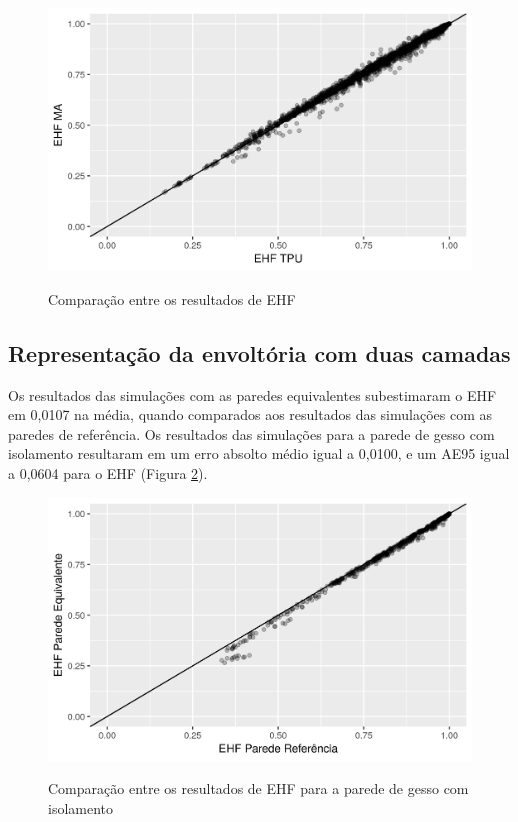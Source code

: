 \documentclass[brazil,hardcopy,openany,a4paper]{ufscthesis}
\begin{document}
		\begin{figure}[H]
			\centering
			\caption{Comparação entre os resultados de EHF}
			\includegraphics[width=1\linewidth]{img/cpaverage_EHF_scatter.png}
			\label{fig:cpaverage_EHF_scatter}
		\end{figure}
	
	\subsection{Representação da envoltória com duas camadas}
		
		Os resultados das simulações com as paredes equivalentes subestimaram o EHF em 0,0107 na média, quando comparados aos resultados das simulações com as paredes de referência. 
		Os resultados das simulações para a parede de gesso com isolamento resultaram em um erro absolto médio igual a 0,0100, e um AE95 igual a 0,0604 para o EHF (Figura \ref{fig:par3_scatter}).
		
		\begin{figure}[H]
			\centering
			\caption{Comparação entre os resultados de EHF para a parede de gesso com isolamento}
			\includegraphics[width=1\linewidth]{img/paredeeq_EHF_par3_scatter.png}
			\label{fig:par3_scatter}
		\end{figure}
		
\end{document}
